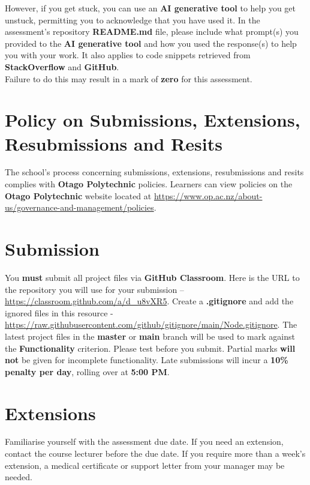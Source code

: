 \documentclass{article}
\begin{document}
 However, if you get stuck, you can use an \textbf{AI generative tool} to help you get unstuck, permitting you to acknowledge that you have used it. In the assessment's repository \textbf{README.md} file, please include what prompt(s) you provided to the \textbf{AI generative tool} and how you used the response(s) to help you with your work. It also applies to code snippets retrieved from \textbf{StackOverflow} and \textbf{GitHub}. \\
 
 Failure to do this may result in a mark of \textbf{zero} for this assessment.

\section*{Policy on Submissions, Extensions, Resubmissions and Resits}
The school's process concerning submissions, extensions, resubmissions and resits complies with \textbf{Otago Polytechnic} policies. Learners can view policies on the \textbf{Otago Polytechnic} website located at \href{https://www.op.ac.nz/about-us/governance-and-management/policies}{https://www.op.ac.nz/about-us/governance-and-management/policies}.

\section*{Submission}
You \textbf{must} submit all project files via \textbf{GitHub Classroom}. Here is the URL to the repository you will use for your submission – \href{https://classroom.github.com/a/d\_u8vXR5}{https://classroom.github.com/a/d\_u8vXR5}.  Create a \textbf{.gitignore} and add the ignored files in this resource - \href{https://raw.githubusercontent.com/github/gitignore/main/Node.gitignore}{https://raw.githubusercontent.com/github/gitignore/main/Node.gitignore}. The latest project files in the \textbf{master} or \textbf{main} branch will be used to mark against the \textbf{Functionality} criterion. Please test before you submit. Partial marks \textbf{will not} be given for incomplete functionality. Late submissions will incur a \textbf{10\% penalty per day}, rolling over at \textbf{5:00 PM}.

\section*{Extensions}
Familiarise yourself with the assessment due date. If you need an extension, contact the course lecturer before the due date. If you require more than a week's extension, a medical certificate or support letter from your manager may be needed.
\end{document}

